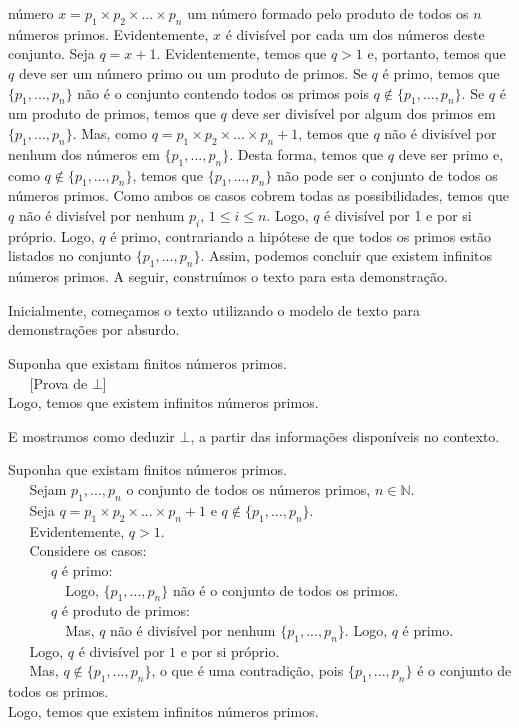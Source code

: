 \begin{Example}
número $x = p_1\times p_2 \times ... \times p_n$ um número formado
pelo produto de todos os $n$ números primos. Evidentemente, $x$ é
divisível por cada um dos números deste conjunto. Seja $q = x +
1$. Evidentemente, temos que $q > 1$ e, portanto, temos que $q$ deve
ser um número primo ou um produto de primos. Se $q$ é primo, temos que
$\{p_1,...,p_n\}$ não é o conjunto contendo todos os primos pois
$q\not\in\{p_1,...,p_n\}$. Se $q$ é um produto de primos, temos que
$q$ deve ser divisível por algum dos primos em $\{p_1,...,p_n\}$. Mas,
como $q = p_1\times p_2 \times ... \times p_n + 1$, temos que $q$ não
é divisível por nenhum dos números em $\{p_1,...,p_n\}$. Desta forma,
temos que $q$ deve ser primo e, como $q\not\in\{p_1,...,p_n\}$, temos
que $\{p_1,...,p_n\}$ não pode ser o conjunto de todos os números primos.
Como ambos os casos cobrem todas as possibilidades,
temos que $q$ não é divisível por nenhum $p_i$, $1\leq
i \leq n$. Logo, $q$ é divisível por 1 e por si próprio. Logo, $q$ é
primo, contrariando a hipótese de que todos os primos estão listados
no conjunto $\{p_1,...,p_n\}$. Assim, podemos concluir que existem
infinitos números primos. A seguir, construímos o texto para esta
demonstração.

Inicialmente, começamos o texto utilizando o modelo de texto para
demonstrações por absurdo.
\begin{flushleft}
Suponha que existam finitos números primos.\\
\verb|   |[Prova de $\bot$]\\
Logo, temos que existem infinitos números primos.
\end{flushleft}

E  mostramos como deduzir $\bot$, a partir das informações disponíveis
no contexto.

\begin{flushleft}
Suponha que existam finitos números primos.\\
\verb|   |Sejam $p_1,...,p_n$ o conjunto de todos os números primos,
$n\in\mathbb{N}$.\\
\verb|   |Seja $q = p_1\times p_2 \times ... \times p_n +1$ e $q\not\in\{p_1,...,p_n\}$.\\
\verb|   |Evidentemente, $q > 1$.\\
\verb|   |Considere os casos:\\
\verb|      |$q$ é primo: \\
\verb|        |Logo,  $\{p_1,...,p_n\}$ não é o conjunto de todos os primos.\\
\verb|      |$q$ é produto de primos:\\
\verb|        |Mas, $q$ não é divisível por nenhum $\{p_1,...,p_n\}$. Logo, $q$ é primo.\\
\verb|   |Logo, $q$ é divisível por $1$ e por si próprio.\\
\verb|   |Mas, $q\not\in\{p_1,...,p_n\}$, o que é uma contradição,
pois $\{p_1,...,p_n\}$ é o conjunto de todos os primos.\\
Logo, temos que existem infinitos números primos.
\end{flushleft}
\end{Example}

